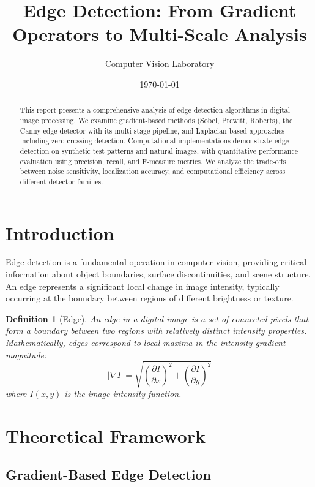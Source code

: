 \documentclass[a4paper, 11pt]{article}
\title{Edge Detection: From Gradient Operators to Multi-Scale Analysis}
\author{Computer Vision Laboratory}
\date{\today}
\newtheorem{definition}{Definition}[section]
\begin{document}
\maketitle

\begin{abstract}
This report presents a comprehensive analysis of edge detection algorithms in digital image
processing. We examine gradient-based methods (Sobel, Prewitt, Roberts), the Canny edge
detector with its multi-stage pipeline, and Laplacian-based approaches including zero-crossing
detection. Computational implementations demonstrate edge detection on synthetic test patterns
and natural images, with quantitative performance evaluation using precision, recall, and
F-measure metrics. We analyze the trade-offs between noise sensitivity, localization accuracy,
and computational efficiency across different detector families.
\end{abstract}

\section{Introduction}

Edge detection is a fundamental operation in computer vision, providing critical information
about object boundaries, surface discontinuities, and scene structure. An edge represents a
significant local change in image intensity, typically occurring at the boundary between
regions of different brightness or texture.

\begin{definition}[Edge]
An edge in a digital image is a set of connected pixels that form a boundary between two
regions with relatively distinct intensity properties. Mathematically, edges correspond to
local maxima in the intensity gradient magnitude:
\begin{equation}
|\nabla I| = \sqrt{\left(\frac{\partial I}{\partial x}\right)^2 + \left(\frac{\partial I}{\partial y}\right)^2}
\end{equation}
where $I(x,y)$ is the image intensity function.
\end{definition}

\section{Theoretical Framework}

\subsection{Gradient-Based Edge Detection}
\end{document}
